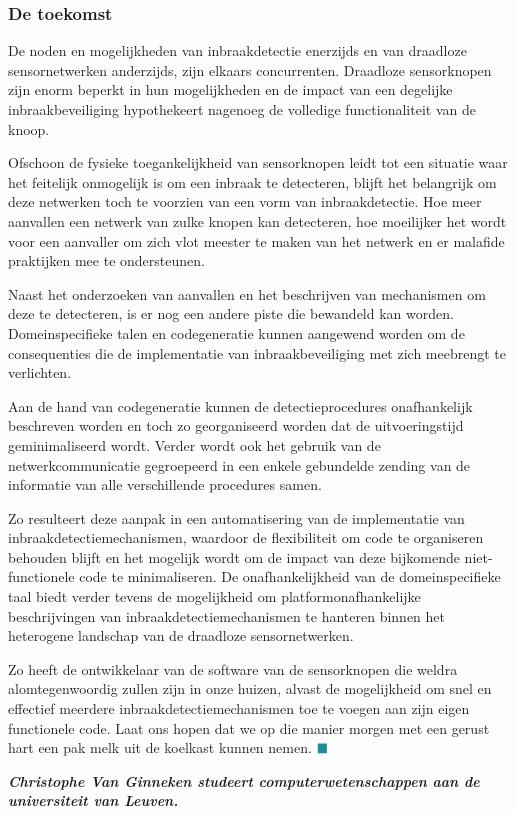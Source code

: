 \documentclass[DIV=calc,paper=a4,fontsize=11pt,twocolumn]{scrartcl}
\newcommand{\heading}[1]{
\subsubsection*{#1}
\vspace{-2mm}
}
\begin{document}
\heading{De toekomst}

De noden en mogelijkheden van inbraakdetectie enerzijds en van draadloze
sensornetwerken anderzijds, zijn elkaars concurrenten. Draadloze sensorknopen
zijn enorm beperkt in hun mogelijkheden en de impact van een degelijke
inbraakbeveiliging hypothekeert nagenoeg de volledige functionaliteit van de
knoop.

Ofschoon de fysieke toegankelijkheid van sensorknopen leidt tot een situatie
waar het feitelijk onmogelijk is om een inbraak te detecteren, blijft het
belangrijk om deze netwerken toch te voorzien van een vorm van inbraakdetectie.
Hoe meer aanvallen een netwerk van zulke knopen kan detecteren, hoe moeilijker
het wordt voor een aanvaller om zich vlot meester te maken van het netwerk en
er malafide praktijken mee te ondersteunen.

Naast het onderzoeken van aanvallen en het beschrijven van mechanismen om deze
te detecteren, is er nog een andere piste die bewandeld kan worden.
Domeinspecifieke talen en codegeneratie kunnen aangewend worden om de
consequenties die de implementatie van inbraakbeveiliging met zich meebrengt te
verlichten.

Aan de hand van codegeneratie kunnen de detectieprocedures onafhankelijk
beschreven worden en toch zo georganiseerd worden dat de uitvoeringstijd
geminimaliseerd wordt. Verder wordt ook het gebruik van de netwerkcommunicatie
gegroepeerd in een enkele gebundelde zending van de informatie van alle
verschillende procedures samen.

Zo resulteert deze aanpak in een automatisering van de implementatie van
inbraakdetectiemechanismen, waardoor de flexibiliteit om code te organiseren
behouden blijft en het mogelijk wordt om de impact van deze bijkomende
niet-functionele code te minimaliseren. De onafhankelijkheid van de
domeinspecifieke taal biedt verder tevens de mogelijkheid om
platformonafhankelijke beschrijvingen van inbraakdetectiemechanismen te hanteren
binnen het heterogene landschap van de draadloze sensornetwerken.

Zo heeft de ontwikkelaar van de software van de sensorknopen die weldra
alomtegenwoordig zullen zijn in onze huizen, alvast de mogelijkheid om snel en
effectief meerdere inbraakdetectiemechanismen toe te voegen aan zijn eigen
functionele code. Laat ons hopen dat we op die manier morgen met een gerust
hart een pak melk uit de koelkast kunnen nemen. $\color{BaseColor}\blacksquare$

\vspace{0.3cm}

\bf{\emph{Christophe Van Ginneken studeert computerwetenschappen aan de
universiteit van Leuven.}}
\end{document}
